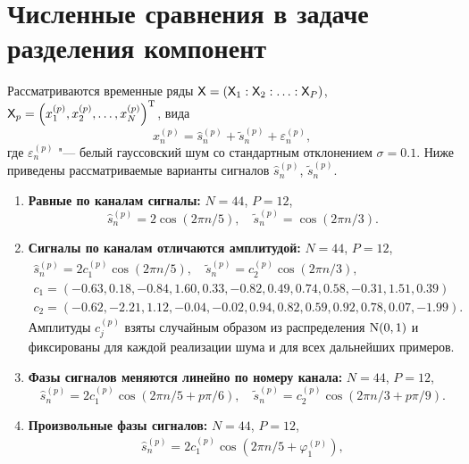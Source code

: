 \documentclass[specialist,
  substylefile=spbu.rtx,
subf,href,colorlinks=true, 12pt]{disser}
\theoremstyle{plain}
\theoremstyle{definition}
\theoremstyle{remark}
\begin{document}
\section{Численные сравнения в задаче разделения компонент}\label{sec:numerical-comp-sep}
Рассматриваются временные ряды $\mathsf{X} = \left(\mathsf{X}_1: \mathsf{X}_2: \ldots: \mathsf{X}_P\right)$,
$\mathsf{X}_p = \left(x_1^{(p)}, x_2^{(p)}, \ldots, x_N^{(p)}\right)^{\mathrm{T}}$, вида
\begin{equation*}
  x_n^{(p)} = \hat{s}_n^{(p)} + \tilde{s}_n^{(p)} + \varepsilon_n^{(p)},
\end{equation*}
где $\varepsilon_n^{(p)}$ "--- белый гауссовский шум со стандартным отклонением $\sigma = 0.1$.
Ниже приведены рассматриваемые варианты сигналов $\hat{s}_n^{(p)}$, $\tilde{s}_n^{(p)}$.
\begin{enumerate}
  \item \textbf{Равные по каналам сигналы:} $N = 44$, $P = 12$,
    \begin{equation}
      \hat{s}_n^{(p)} = 2 \cos(2 \pi n / 5), \quad \tilde{s}_n^{(p)} = \cos(2\pi n /3).
      \label{eq:sep-same}
    \end{equation}
  \item \textbf{Сигналы по каналам отличаются амплитудой:} $N = 44$, $P = 12$,
    \begin{gather}
      \hat{s}_n^{(p)} = 2 c_1^{(p)} \cos(2 \pi n / 5), \quad \tilde{s}_n^{(p)} = c_2^{(p)}\cos(2\pi n /3),
      \label{eq:sep-coeffs}\\
      c_1 = \left(-0.63, 0.18, -0.84, 1.60, 0.33, -0.82, 0.49, 0.74, 0.58, -0.31, 1.51, 0.39\right)\nonumber\\
      c_2 = \left(-0.62, -2.21, 1.12, -0.04, -0.02, 0.94, 0.82, 0.59, 0.92, 0.78, 0.07, -1.99 \right). \nonumber
    \end{gather}
    Амплитуды $c_j^{(p)}$ взяты случайным образом из распределения $\mathrm{N}(0, 1)$ и фиксированы для каждой
    реализации шума и для всех дальнейших примеров.
  \item \textbf{Фазы сигналов меняются линейно по номеру канала:} $N = 44$, $P = 12$,
    \begin{equation}
      \hat{s}_n^{(p)} = 2 c_1^{(p)} \cos(2 \pi n / 5 + p \pi / 6),
      \quad \tilde{s}_n^{(p)} = c_2^{(p)}\cos(2\pi n /3 + p \pi / 9).
      \label{eq:sep-lin-phase}
    \end{equation}
  \item \textbf{Произвольные фазы сигналов:} $N = 44$, $P = 12$,
    \begin{gather}
      \hat{s}_n^{(p)} = 2 c_1^{(p)} \cos(2 \pi n / 5 + \varphi_1^{(p)}),

\end{gather}
\end{enumerate}
\end{document}
